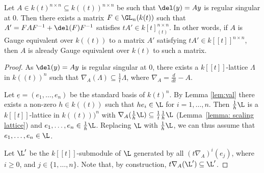\documentclass[a4paper, 11pt]{article}
\begin{document}
\begin{lemma}\label{lem:basis}
	Let $A \in k(t)^{n\times n}\subseteq k((t))^{n\times n}$ be such that $\del(y)=Ay$ is regular singular at $0$. Then there
	exists a matrix $F\in \GL_n(k(t))$ such that $A'=FAF^{-1}+\del(F)F^{-1}$ satisfies $tA'\in k[t]_{(t)}^{n\times n}$. In other words, if $A$ is Gauge equivalent over $k((t))$ to a matrix $A'$ satisfying $tA'\in  k[[t]]^{n\times n}$, then $A$ is already Gauge equivalent over $k(t)$ to such a matrix.
\end{lemma}
\begin{proof}
	As $\del(y)=Ay$ is regular singular at $0$, there exists a $k[[t]]$-lattice $\Lambda$ in $k((t))^n$ such that $\nabla_A(\Lambda)\subseteq \frac{1}{t}\Lambda$, where $\nabla_A=\frac{d}{dt}-A$. 
	
%	

Let $\underline{e}=(e_1,\ldots,e_n)$ be the standard basis of $k(t)^n$. By Lemma \ref{lem:val} there exists a non-zero $h\in k((t))$ such that $he_i\in \L$ for $i=1,\ldots,n$. Then $\frac{1}{h}\L$ is a $k[[t]]$-lattice in $k((t)))^n$ with $\nabla_A(\frac{1}{h}\L)\subseteq \frac{1}{t}\frac{1}{h}\L$ (Lemma~\ref{lemma: scaling lattice}) and $e_1,\ldots,e_n\in \frac{1}{h}\L$.
Replacing $\L$ with $\frac{1}{h}\L$, we can thus assume that $e_1,\ldots,e_n\in \L$.
	
	Let $\L'$ be the  $k[[t]]$-submodule of $\L$ generated by all $(t\nabla_A)^i(e_j)$, where $i\geq 0$, and $j\in \{1,\ldots,n\}$. Note that, by construction, $t\nabla_A(\L')\subseteq \L'$.
	
	
	

\end{proof}
\end{document}
